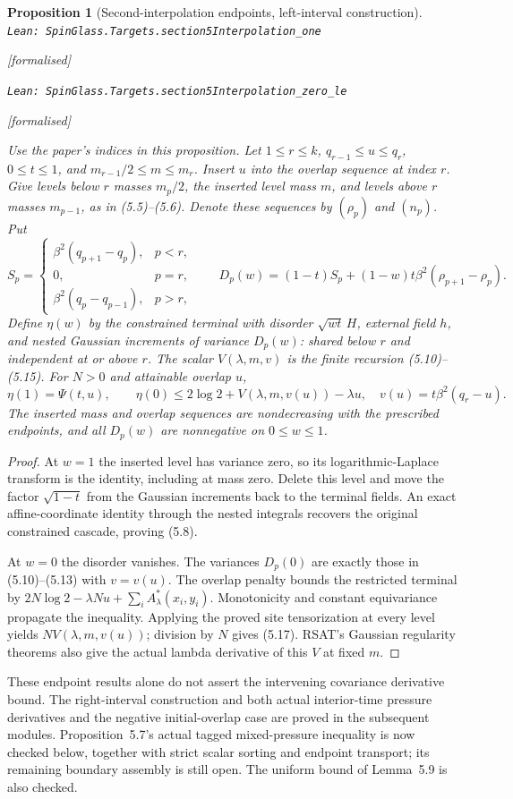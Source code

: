 \documentclass[11pt]{article}
\providecommand{\lean}[1]{\leavevmode\par\nopagebreak
  {\noindent\normalfont\footnotesize\raggedright\texttt{Lean: #1}\par}\nopagebreak}
\providecommand{\leanok}{\par\nopagebreak
  {\noindent\normalfont\footnotesize\textcolor{green!50!black}{[formalised]}\par}\nopagebreak}
\newtheorem{proposition}[theorem]{Proposition}
\begin{document}
\begin{proposition}[Second-interpolation endpoints, left-interval construction]
\lean{SpinGlass.Targets.section5Interpolation\_one}\leanok
\lean{SpinGlass.Targets.section5Interpolation\_zero\_le}\leanok
Use the paper's indices in this proposition. Let $1\le r\le k$,
$q_{r-1}\le u\le q_r$, $0\le t\le1$, and
$m_{r-1}/2\le m\le m_r$. Insert $u$ into the overlap sequence at index $r$.
Give levels below $r$ masses $m_p/2$, the inserted level mass $m$, and levels
above $r$ masses $m_{p-1}$, as in (5.5)--(5.6). Denote these sequences by
$(\rho_p)$ and $(n_p)$. Put
\[
S_p=\begin{cases}
\beta^2(q_{p+1}-q_p),&p<r,\\
0,&p=r,\\
\beta^2(q_p-q_{p-1}),&p>r,
\end{cases}
\qquad
D_p(w)=(1-t)S_p+(1-w)t\beta^2(\rho_{p+1}-\rho_p).
\]
Define $\eta(w)$ by the constrained terminal with disorder
$\sqrt{wt}\,H$, external field $h$, and nested Gaussian increments of variance
$D_p(w)$: shared below $r$ and independent at or above $r$.
The scalar $V(\lambda,m,v)$ is the finite recursion (5.10)--(5.15).
For $N>0$ and attainable overlap $u$,
\[
\eta(1)=\Psi(t,u),\qquad
\eta(0)\le2\log2+V(\lambda,m,v(u))-\lambda u,
\quad v(u)=t\beta^2(q_r-u).
\]
The inserted mass and overlap sequences are nondecreasing with the prescribed
endpoints, and all $D_p(w)$ are nonnegative on $0\le w\le1$.
\end{proposition}
\begin{proof}
At $w=1$ the inserted level has variance zero, so its logarithmic-Laplace
transform is the identity, including at mass zero. Delete this level and move
the factor $\sqrt{1-t}$ from the Gaussian increments back to the terminal
fields. An exact affine-coordinate identity through the nested integrals
recovers the original constrained cascade, proving (5.8).

At $w=0$ the disorder vanishes. The variances $D_p(0)$ are exactly those in
(5.10)--(5.13) with $v=v(u)$. The overlap penalty bounds the restricted
terminal by $2N\log2-\lambda Nu+\sum_i A^*_{\lambda}(x_i,y_i)$.
Monotonicity and constant equivariance propagate the inequality. Applying the
proved site tensorization at every level yields $N V(\lambda,m,v(u))$;
division by $N$ gives (5.17). RSAT's Gaussian regularity theorems also give
the actual lambda derivative of this $V$ at fixed $m$.
\end{proof}
These endpoint results alone do not assert the intervening covariance derivative
bound. The right-interval construction and both actual interior-time pressure
derivatives and the negative initial-overlap case are proved in the subsequent
modules. Proposition~5.7's actual tagged mixed-pressure inequality is now
checked below, together with strict scalar sorting and endpoint transport;
its remaining boundary assembly is still open. The uniform bound of
Lemma~5.9 is also checked.
\end{document}
